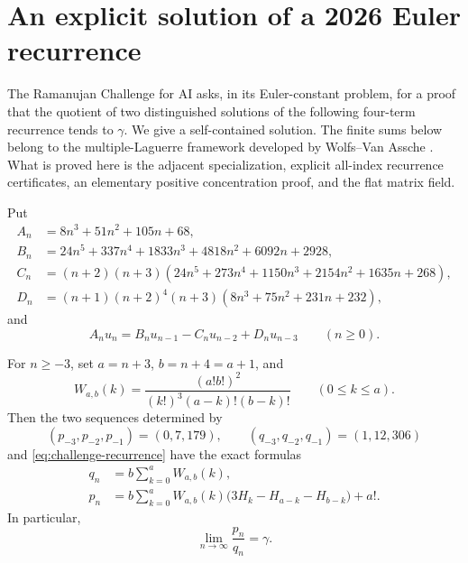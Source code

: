 \section{An explicit solution of a 2026 Euler recurrence}
\label{sec:ramanujan-recurrence}

The Ramanujan Challenge for AI \cite{RamanujanChallenge2026} asks, in its
Euler-constant problem, for a proof that the quotient of two distinguished
solutions of the following four-term recurrence tends to \(\gamma\).  We
give a self-contained solution.  The finite sums below belong to the
multiple-Laguerre framework developed by Wolfs--Van Assche
\cite{WolfsVanAssche2025}.  What is proved here is the adjacent
specialization, explicit all-index recurrence certificates, an elementary
positive concentration proof, and the flat matrix field.

Put
\begin{align*}
 A_n&=8n^3+51n^2+105n+68,\\
 B_n&=24n^5+337n^4+1833n^3+4818n^2+6092n+2928,\\
 C_n&=(n+2)(n+3)
 (24n^5+273n^4+1150n^3+2154n^2+1635n+268),\\
 D_n&=(n+1)(n+2)^4(n+3)
 (8n^3+75n^2+231n+232),
\end{align*}
and
\begin{equation}\label{eq:challenge-recurrence}
 A_nu_n=B_nu_{n-1}-C_nu_{n-2}+D_nu_{n-3}
 \qquad(n\ge0).
\end{equation}

\begin{theorem}
\label{thm:challenge-solution}
For \(n\ge-3\), set \(a=n+3\), \(b=n+4=a+1\), and
\begin{equation}\label{eq:Wab}
 W_{a,b}(k)=
 \frac{(a!b!)^2}{(k!)^3(a-k)!(b-k)!}
 \qquad(0\le k\le a).
\end{equation}
Then the two sequences determined by
\[
 (p_{-3},p_{-2},p_{-1})=(0,7,179),
 \qquad
 (q_{-3},q_{-2},q_{-1})=(1,12,306)
\]
and \eqref{eq:challenge-recurrence} have the exact formulas
\begin{align}
 q_n&=b\sum_{k=0}^{a}W_{a,b}(k),
 \label{eq:qn-closed}\\
 p_n&=b\sum_{k=0}^{a}W_{a,b}(k)
 \bigl(3H_k-H_{a-k}-H_{b-k}\bigr)+a!.
 \label{eq:pn-closed}
\end{align}
In particular,
\begin{equation}\label{eq:challenge-limit}
 \boxed{\displaystyle\lim_{n\to\infty}\frac{p_n}{q_n}=\gamma.}
\end{equation}
\end{theorem}

